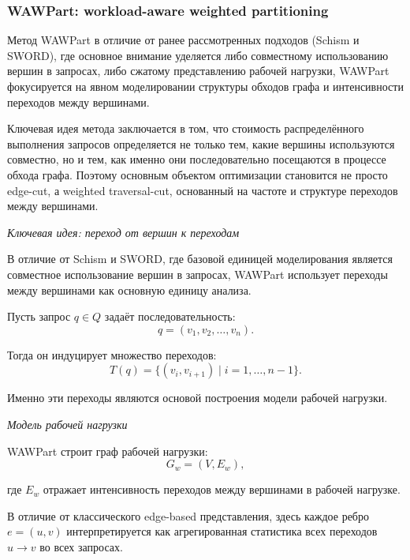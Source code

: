 \subsubsection{WAWPart: workload-aware weighted partitioning}

Метод WAWPart \cite{wawpart} в отличие от ранее рассмотренных подходов (Schism и SWORD), где основное внимание уделяется либо совместному использованию вершин в запросах, либо сжатому представлению рабочей нагрузки, WAWPart фокусируется на явном моделировании структуры обходов графа и интенсивности переходов между вершинами.

Ключевая идея метода заключается в том, что стоимость распределённого выполнения запросов определяется не только тем, какие вершины используются совместно, но и тем, как именно они последовательно посещаются в процессе обхода графа. Поэтому основным объектом оптимизации становится не просто edge-cut, а weighted traversal-cut, основанный на частоте и структуре переходов между вершинами.

\textit{Ключевая идея: переход от вершин к переходам}

В отличие от Schism и SWORD, где базовой единицей моделирования является совместное использование вершин в запросах, WAWPart использует переходы между вершинами как основную единицу анализа.

Пусть запрос $q \in Q$ задаёт последовательность:
\begin{equation*}
q = (v_1, v_2, \dots, v_n).
\end{equation*}

Тогда он индуцирует множество переходов:
\begin{equation*}
T(q) = \{(v_i, v_{i+1}) \mid i = 1, \dots, n-1\}.
\end{equation*}

Именно эти переходы являются основой построения модели рабочей нагрузки.

\textit{Модель рабочей нагрузки}

WAWPart строит граф рабочей нагрузки:
\begin{equation*}
G_w = (V, E_w),
\end{equation*}

где $E_w$ отражает интенсивность переходов между вершинами в рабочей нагрузке.

В отличие от классического edge-based представления, здесь каждое ребро $e=(u,v)$ интерпретируется как агрегированная статистика всех переходов $u \rightarrow v$ во всех запросах.

